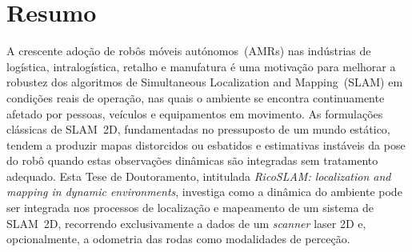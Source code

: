 \chapter*{Resumo}

A crescente adoção de robôs móveis autónomos~(AMRs) nas indústrias de
logística, intralogística, retalho e manufatura é uma motivação para melhorar a robustez dos
algoritmos de Simultaneous Localization and Mapping~(SLAM) em condições
reais de operação, nas quais o ambiente se encontra continuamente
afetado por pessoas, veículos e equipamentos em movimento. As formulações
clássicas de SLAM~2D, fundamentadas no pressuposto de um mundo estático,
tendem a produzir mapas distorcidos ou esbatidos e estimativas instáveis
da pose do robô quando estas observações dinâmicas são integradas sem
tratamento adequado. Esta Tese de Doutoramento, intitulada
\textit{RicoSLAM: localization and mapping in dynamic environments},
investiga como a dinâmica do ambiente pode ser integrada nos processos
de localização e mapeamento de um sistema de SLAM~2D, recorrendo
exclusivamente a dados de um \emph{scanner} laser 2D e, opcionalmente, a
odometria das rodas como modalidades de perceção.

